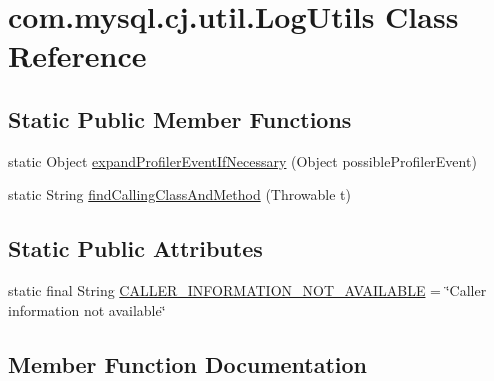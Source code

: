 \hypertarget{classcom_1_1mysql_1_1cj_1_1util_1_1_log_utils}{}\section{com.\+mysql.\+cj.\+util.\+Log\+Utils Class Reference}
\label{classcom_1_1mysql_1_1cj_1_1util_1_1_log_utils}
\subsection*{Static Public Member Functions}
\begin{DoxyCompactItemize}
\item 
static Object \mbox{\hyperlink{classcom_1_1mysql_1_1cj_1_1util_1_1_log_utils_ab272d0bf97ff3ebf04de6b4b60048538}{expand\+Profiler\+Event\+If\+Necessary}} (Object possible\+Profiler\+Event)
\item 
static String \mbox{\hyperlink{classcom_1_1mysql_1_1cj_1_1util_1_1_log_utils_aa15ea38a6fed92c6cb4ebdd068791a4e}{find\+Calling\+Class\+And\+Method}} (Throwable t)
\end{DoxyCompactItemize}
\subsection*{Static Public Attributes}
\begin{DoxyCompactItemize}
\item 
static final String \mbox{\hyperlink{classcom_1_1mysql_1_1cj_1_1util_1_1_log_utils_a4523dd05d0aee6db8101d30781ecafb2}{C\+A\+L\+L\+E\+R\+\_\+\+I\+N\+F\+O\+R\+M\+A\+T\+I\+O\+N\+\_\+\+N\+O\+T\+\_\+\+A\+V\+A\+I\+L\+A\+B\+LE}} = \char`\"{}Caller information not available\char`\"{}
\end{DoxyCompactItemize}


\subsection{Member Function Documentation}
\mbox{\label{classcom_1_1mysql_1_1cj_1_1util_1_1_log_utils_ab272d0bf97ff3ebf04de6b4b60048538}} 
